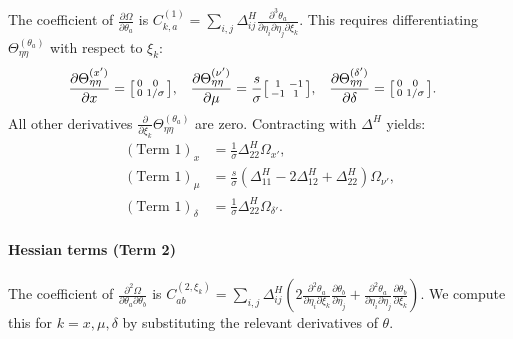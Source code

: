 \documentclass{article}
\begin{document}
The coefficient of $\frac{\partial \Omega}{\partial \theta_a}$ is $C^{(1)}_{k,a} = \sum_{i,j} \Delta^H_{ij} \frac{\partial^3 \theta_a}{\partial \eta_i \partial \eta_j \partial \xi_k}$.
This requires differentiating $\Theta_{\eta\eta}^{(\theta_a)}$ with respect to $\xi_k$:
%
\begin{align}
  \frac{\partial \Theta_{\eta\eta}^{(x')}}{\partial x}           & = \begin{bsmallmatrix} 0 & 0 \\ 0 & 1/\sigma \end{bsmallmatrix},                  &
  \frac{\partial \Theta_{\eta\eta}^{(\nu')}}{\partial \mu}       & = \frac{s}{\sigma} \begin{bsmallmatrix} 1 & -1 \\ -1 & 1 \end{bsmallmatrix}, &
  \frac{\partial \Theta_{\eta\eta}^{(\delta')}}{\partial \delta} & = \begin{bsmallmatrix} 0 & 0 \\ 0 & 1/\sigma \end{bsmallmatrix}.
\end{align}
%
All other derivatives $\frac{\partial}{\partial \xi_k} \Theta_{\eta\eta}^{(\theta_a)}$ are zero.
Contracting with $\Delta^H$ yields:
%
\begin{align}
  (\text{Term 1})_x      & = \frac{1}{\sigma} \Delta^H_{22} \Omega_{x'},                                      \\
  (\text{Term 1})_\mu    & = \frac{s}{\sigma} (\Delta^H_{11} - 2\Delta^H_{12} + \Delta^H_{22}) \Omega_{\nu'}, \\
  (\text{Term 1})_\delta & = \frac{1}{\sigma} \Delta^H_{22} \Omega_{\delta'}.
\end{align}

\paragraph{Hessian terms (Term 2)}

The coefficient of $\frac{\partial^2 \Omega}{\partial \theta_a \partial \theta_b}$ is $C^{(2,\xi_k)}_{ab} = \sum_{i,j} \Delta^H_{ij} ( 2 \frac{\partial^2 \theta_a}{\partial \eta_i \partial \xi_k} \frac{\partial \theta_b}{\partial \eta_j} + \frac{\partial^2 \theta_a}{\partial \eta_i \partial \eta_j} \frac{\partial \theta_b}{\partial \xi_k} )$.
We compute this for $k=x, \mu, \delta$ by substituting the relevant derivatives of $\theta$.
\end{document}
